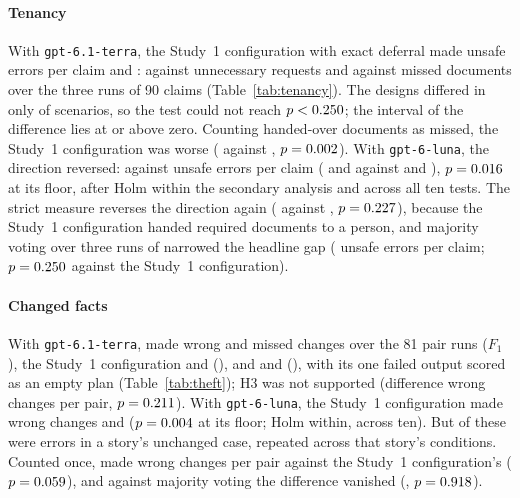 \paragraph{Tenancy}
With \texttt{gpt-6.1-terra}, the Study~1 configuration with exact deferral made \ctTerraHOneA{} unsafe errors per claim and  \ctTerraHOneB: \tenTerraCPxFP{} against \tenTerraBoneFP{} unnecessary requests and \tenTerraCPxMissN{} against \tenTerraBoneMissN{} missed documents over the three runs of 90 claims (Table~\ref{tab:tenancy}). The designs differed in only \ctTerraHOneNonzero{} of \ctTerraHOneClusters{} scenarios, so the test could not reach $p<0.250$; the interval of the difference lies at or above zero. Counting handed-over documents as missed, the Study~1 configuration was worse (\ctTerraHOneStrictA{} against \ctTerraHOneStrictB, $p=0.002$). With \texttt{gpt-6-luna}, the direction reversed: \ctLunaHOneA{} against \ctLunaHOneB{} unsafe errors per claim (\tenLunaCPxFP{} and \tenLunaCPxMissN{} against \tenLunaBoneFP{} and \tenLunaBoneMissN), $p=0.016$ at its floor, \ptLunaHOne{} after Holm within the secondary analysis and \ptLunaHOneHolmAll{} across all ten tests. The strict measure reverses the direction again (\ctLunaHOneStrictA{} against \ctLunaHOneStrictB, $p=0.227$), because the Study~1 configuration handed \tenLunaCPxHandedN{} required documents to a person, and majority voting over three runs of  narrowed the headline gap (\ctLunaHOneSCB{} unsafe errors per claim; $p=0.250$ against the Study~1 configuration).

\paragraph{Changed facts}
With \texttt{gpt-6.1-terra},  made \thTerraRWrong{} wrong and \thTerraRMissed{} missed changes over the 81 pair runs ($F_1$ \thTerraRFone), the Study~1 configuration \thTerraCPWrong{} and \thTerraCPMissed{} (\thTerraCPFone), and  \thTerraDWrong{} and \thTerraDMissed{} (\thTerraDFone), with its one failed output scored as an empty plan (Table~\ref{tab:theft}); H3 was not supported (difference \ctTerraHThreeRDiff{} wrong changes per pair, $p=0.211$). With \texttt{gpt-6-luna}, the Study~1 configuration made \thLunaCPWrong{} wrong changes and  \thLunaRWrong{} ($p=0.004$ at its floor; Holm \ptLunaHThree{} within, \ptLunaHThreeHolmAll{} across ten). But \thLunaRWrongInShared{} of these \thLunaRWrong{} were errors in a story's unchanged case, repeated across that story's conditions. Counted once,  made \thLunaRDedupWrongPP{} wrong changes per pair against the Study~1 configuration's \thLunaCPDedupWrongPP{} ($p=0.059$), and against majority voting the difference vanished (\ctLunaHThreeDedupRSCDiff, $p=0.918$).

